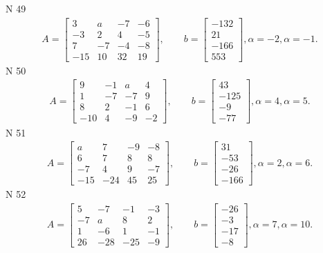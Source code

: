 \documentclass[11pt]{report}
\begin{document}
N 49
\begin{align*}
 A = \left[\begin{matrix}3 & a & -7 & -6\\-3 & 2 & 4 & -5\\7 & -7 & -4 & -8\\-15 & 10 & 32 & 19\end{matrix}\right],
    \qquad b = \left[\begin{matrix}-132\\21\\-166\\553\end{matrix}\right], \alpha = -2, \alpha = -1. 
 \end{align*}
N 50
\begin{align*}
 A = \left[\begin{matrix}9 & -1 & a & 4\\1 & -7 & -7 & 9\\8 & 2 & -1 & 6\\-10 & 4 & -9 & -2\end{matrix}\right],
    \qquad b = \left[\begin{matrix}43\\-125\\-9\\-77\end{matrix}\right], \alpha = 4, \alpha = 5. 
 \end{align*}
N 51
\begin{align*}
 A = \left[\begin{matrix}a & 7 & -9 & -8\\6 & 7 & 8 & 8\\-7 & 4 & 9 & -7\\-15 & -24 & 45 & 25\end{matrix}\right],
    \qquad b = \left[\begin{matrix}31\\-53\\-26\\-166\end{matrix}\right], \alpha = 2, \alpha = 6. 
 \end{align*}
N 52
\begin{align*}
 A = \left[\begin{matrix}5 & -7 & -1 & -3\\-7 & a & 8 & 2\\1 & -6 & 1 & -1\\26 & -28 & -25 & -9\end{matrix}\right],
    \qquad b = \left[\begin{matrix}-26\\-3\\-17\\-8\end{matrix}\right], \alpha = 7, \alpha = 10. 
 \end{align*}
\end{document}
